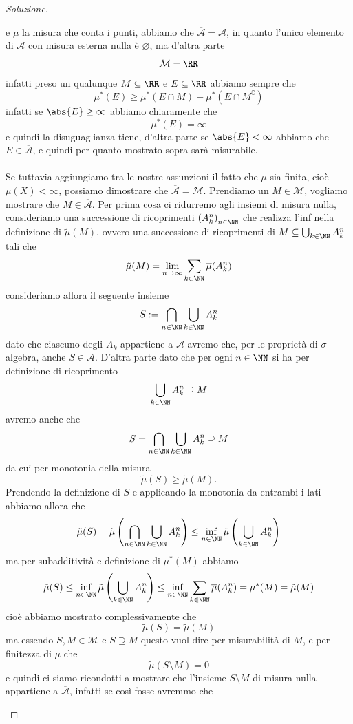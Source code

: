 \documentclass[11pt]{scrartcl}
\newcommand{\eset}{\varnothing}
\begin{document}
\begin{proof}[Soluzione]
\begin{enumerate}
			e $\mu$ la misura che conta i punti, abbiamo che $\overline{\mathcal{A}}=\mathcal{A}$, in quanto l'unico elemento di $\mathcal{A}$ con misura esterna nulla è $\eset$, ma d'altra parte 
			$$\mathcal{M}=\RR$$
			infatti preso un qualunque $M\subseteq \RR$ e $E\subseteq\RR$ abbiamo sempre che
			$$\mu^*(E)\ge \mu^*(E\cap M)+\mu^*(E\cap M^\complement)$$
			infatti se $\abs{E}\ge \infty$ abbiamo chiaramente che 
			$$\mu^*(E)=\infty$$
			e quindi la disuguaglianza tiene, d'altra parte se $\abs{E}<\infty$ abbiamo che $E\in \overline{\mathcal{A}}$, e quindi per quanto mostrato sopra sarà misurabile. 
			\\
			\\
			Se tuttavia aggiungiamo tra le nostre assunzioni il fatto che $\mu$ sia finita, cioè $\mu(X)<\infty$, possiamo dimostrare che $\overline{\mathcal{A}}=\mathcal{M}$. Prendiamo un $M\in \mathcal{M}$, vogliamo mostrare che $M\in\overline{\mathcal{A}}$. Per prima cosa ci ridurremo agli insiemi di misura nulla, consideriamo una successione di ricoprimenti $\left(A^n_k\right)_{n\in\NN}$ che realizza l'inf nella definizione di $\tilde{\mu}(M)$, ovvero una successione di ricoprimenti di $M\subseteq \bigcup_{k\in\NN}A_k^n$ tali che
			$$\tilde{\mu}(M)=\lim_{n\to\infty}\sum_{k\in\NN}\overline{\mu}(A_k^n)$$
			consideriamo allora il seguente insieme
			$$S:=\bigcap_{n\in\NN}\bigcup_{k\in\NN}A_k^n$$
			dato che ciascuno degli $A_k$ appartiene a $\overline{\mathcal{A}}$ avremo che, per le proprietà di $\sigma$-algebra, anche $S\in\overline{\mathcal{A}}$. D'altra parte dato che per ogni $n\in\NN$ si ha per definizione di ricoprimento
			$$\bigcup_{k\in\NN}A_k^n \supseteq M$$
			avremo anche che
			$$S=\bigcap_{n\in\NN}\bigcup_{k\in\NN}A_k^n\supseteq M$$
			da cui per monotonia della misura
			$$\tilde{\mu}(S)\ge \tilde{\mu}(M).$$
			Prendendo la definizione di $S$ e applicando la monotonia da entrambi i lati abbiamo allora che
			$$\tilde{\mu}(S)=\tilde{\mu}\left(\bigcap_{n\in\NN}\bigcup_{k\in\NN}A_k^n\right)\le \inf_{n\in\NN} \tilde{\mu}\left(\bigcup_{k\in\NN} A^n_k\right)$$
			ma per subadditività e definizione di $\mu^*(M)$ abbiamo
			$$\tilde{\mu}(S)\le \inf_{n\in\NN}\tilde{\mu}\left(\bigcup_{k\in\NN}A^n_k\right)\le \inf_{n\in\NN}\sum_{k\in\NN}\overline{\mu}(A^n_k)=\mu^*(M)=\tilde{\mu}(M)$$
			cioè abbiamo mostrato complessivamente che
			$$\tilde{\mu}(S)=\tilde{\mu}(M)$$
			ma essendo $S,M\in\mathcal{M}$ e $S\supseteq M$ questo vuol dire per misurabilità di $M$, e per finitezza di $\mu$ che
			$$\tilde{\mu}(S\setminus M)=0$$
			e quindi ci siamo ricondotti a mostrare che l'insieme $S\setminus M$ di misura nulla appartiene a $\overline{\mathcal{A}}$, infatti se così fosse avremmo che

\end{enumerate}
\end{proof}
\end{document}
